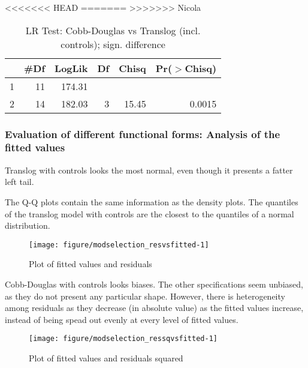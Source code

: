 \documentclass[12pt,a4paper]{article}\usepackage[]{graphicx}\usepackage[]{color}
\newenvironment{knitrout}{}{} %
\begin{document}
<<<<<<< HEAD
=======
>>>>>>> Nicola
\begin{table}[ht]
\centering
\caption{LR Test: Cobb-Douglas vs Translog (incl. controls); sign. difference} 
\label{LR with controls}
\begin{tabular}{lrrrrr}
  \hline
 & \#Df & LogLik & Df & Chisq & Pr($>$Chisq) \\ 
  \hline
1 & 11 & 174.31 &  &  &  \\ 
  2 & 14 & 182.03 & 3 & 15.45 & 0.0015 \\ 
   \hline
\end{tabular}
\end{table}




\subsubsection{Evaluation of different functional forms: Analysis of the fitted values}

Translog with controls looks the most normal, even though it presents a fatter left tail.

The Q-Q plots contain the same information as the density plots. The quantiles of the translog model with controls are the closest to the quantiles of a normal distribution.


\begin{knitrout}
\color{fgcolor}\begin{figure}[htbp]

{\centering \texttt{[image: figure/modselection\_resvsfitted-1]} 

}

\caption[Plot of fitted values and residuals]{Plot of fitted values and residuals}\label{fig:modselection_resvsfitted}
\end{figure}


\end{knitrout}

Cobb-Douglas with controls looks biases. The other specifications seem unbiased, as they do not present any particular shape. However, there is heterogeneity among residuals as they decrease (in absolute value) as the fitted values increase, instead of being spead out evenly at every level of fitted values.


\begin{knitrout}
\color{fgcolor}\begin{figure}[htbp]

{\centering \texttt{[image: figure/modselection\_ressqvsfitted-1]} 

}

\caption[Plot of fitted values and residuals squared]{Plot of fitted values and residuals squared}\label{fig:modselection_ressqvsfitted}
\end{figure}


\end{knitrout}
\end{document}
